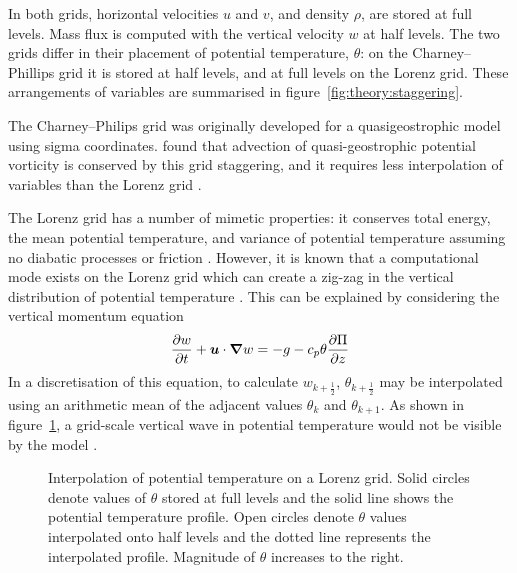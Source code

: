 In both grids, horizontal velocities $u$ and $v$, and density $\rho$, are stored at full levels.  Mass flux is computed with the vertical velocity $w$ at half levels.  The two grids differ in their placement of potential temperature, $\theta$: on the Charney--Phillips grid it is stored at half levels, and at full levels on the Lorenz grid.  These arrangements of variables are summarised in figure~\ref{fig:theory:staggering}.

The Charney--Philips grid was originally developed for a quasigeostrophic model using sigma coordinates.  \textcite{arakawa-moorthi1988} found that advection of quasi-geostrophic potential vorticity is conserved by this grid staggering, and it requires less interpolation of variables than the Lorenz grid \autocite{holdaway2013}. 

The Lorenz grid has a number of mimetic properties: it conserves total energy, the mean potential temperature, and variance of potential temperature assuming no diabatic processes or friction \textcite{arakawa-konor1996}.  However, it is known that a computational mode exists on the Lorenz grid which can create a zig-zag in the vertical distribution of potential temperature \parencites{arakawa-moorthi1988}{arakawa-konor1996}{holdaway2013b}.  This can be explained by considering the vertical momentum equation \autocite{holdaway2013}
\begin{align}
	\frac{\partial w}{\partial t} + \bm{u} \cdot \boldsymbol{\nabla} w = -g - c_p \theta \frac{\partial \Pi}{\partial z}
\end{align}
In a discretisation of this equation, to calculate $w_{k+\frac{1}{2}}$, $\theta_{k+\frac{1}{2}}$ may be interpolated using an arithmetic mean of the adjacent values $\theta_k$ and $\theta_{k+1}$.  As shown in figure~\ref{fig:theory:theta-oscillation}, a grid-scale vertical wave in potential temperature would not be visible by the model \autocite{holdaway2013}.  

\begin{figure}
	\centering
	
	\caption{Interpolation of potential temperature on a Lorenz grid.  Solid circles denote values of $\theta$ stored at full levels and the solid line shows the potential temperature profile.  Open circles denote $\theta$ values interpolated onto half levels and the dotted line represents the interpolated profile.  Magnitude of $\theta$ increases to the right.}
	\label{fig:theory:theta-oscillation}
\end{figure}
